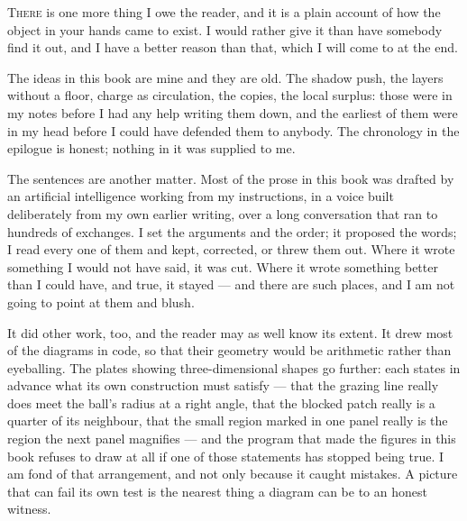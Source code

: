 \documentclass[fontsize=11pt,paper=a4,pagesize=auto,parskip=half-]{scrbook}
\newif\ifdraftnotes
\newcommand{\draftstatus}[1]{\ifdraftnotes{\small\itshape\color{black!60}#1\par}\fi\medskip}
\begin{document}
\draftstatus{Draft 1}

\lettrine{T}{here} is one more thing I owe the reader, and it is a plain account of how the object in your hands came to exist. I would rather give it than have somebody find it out, and I have a better reason than that, which I will come to at the end.

The ideas in this book are mine and they are old. The shadow push, the layers without a floor, charge as circulation, the copies, the local surplus: those were in my notes before I had any help writing them down, and the earliest of them were in my head before I could have defended them to anybody. The chronology in the epilogue is honest; nothing in it was supplied to me.

The sentences are another matter. Most of the prose in this book was drafted by an artificial intelligence working from my instructions, in a voice built deliberately from my own earlier writing, over a long conversation that ran to hundreds of exchanges. I set the arguments and the order; it proposed the words; I read every one of them and kept, corrected, or threw them out. Where it wrote something I would not have said, it was cut. Where it wrote something better than I could have, and true, it stayed --- and there are such places, and I am not going to point at them and blush.

It did other work, too, and the reader may as well know its extent. It drew most of the diagrams in code, so that their geometry would be arithmetic rather than eyeballing. The plates showing three-dimensional shapes go further: each states in advance what its own construction must satisfy --- that the grazing line really does meet the ball's radius at a right angle, that the blocked patch really is a quarter of its neighbour, that the small region marked in one panel really is the region the next panel magnifies --- and the program that made the figures in this book refuses to draw at all if one of those statements has stopped being true. I am fond of that arrangement, and not only because it caught mistakes. A picture that can fail its own test is the nearest thing a diagram can be to an honest witness.
\end{document}
